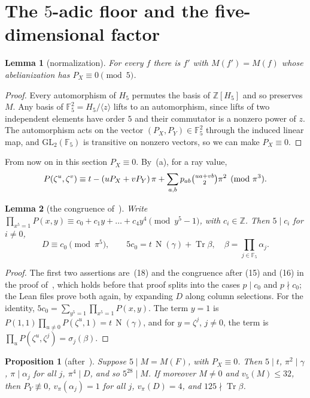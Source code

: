 \documentclass[11pt]{article}
\newtheorem{lemma}{Lemma}
\newtheorem{proposition}{Proposition}
\theoremstyle{definition}
\theoremstyle{remark}
\newcommand{\F}{\mathbb F_5}
\newcommand{\Z}{\mathbb Z}
\newcommand{\Tr}{\operatorname{Tr}}
\newcommand{\N}{\operatorname{N}}
\newcommand{\vp}{v_\pi}
\begin{document}
\section{The \texorpdfstring{$5$}{5}-adic floor and the five-dimensional factor}\label{sec:floor}

\begin{lemma}[normalization]\label{lem:normalize}
For every $f$ there is $f'$ with $M(f')=M(f)$ whose abelianization has
$P_X\equiv0\pmod5$.
\end{lemma}

\begin{proof}
Every automorphism of $H_5$ permutes the basis of $\Z[H_5]$ and so preserves
$M$. Any basis of $\F^2=H_5/\langle z\rangle$ lifts to an automorphism, since
lifts of two independent elements have order $5$ and their commutator is a
nonzero power of $z$. The automorphism acts on the vector $(P_X,P_Y)\in\F^2$ through the induced
linear map, and $\mathrm{GL}_2(\F)$ is transitive on nonzero vectors, so we can
make $P_X\equiv0$.
\end{proof}

\noindent From now on in this section $P_X\equiv0$. By~(a), for a ray value,
\begin{equation}\label{eq:taylor}
P(\zeta^u,\zeta^v)\equiv t-(uP_X+vP_Y)\,\pi+\sum_{a,b}p_{ab}\tbinom{ua+vb}{2}\pi^2\pmod{\pi^3}.
\end{equation}

\begin{lemma}[{the congruence of~\cite{mp}}]\label{lem:c0}
Write $\prod_{x^5=1}P(x,y)\equiv c_0+c_1y+\dots+c_4y^4\pmod{y^5-1}$, with
$c_i\in\Z$. Then $5\mid c_i$ for $i\ne0$,
\[
D\equiv c_0\pmod{\pi^5},\qquad 5c_0=t\,\N(\gamma)+\Tr\beta,\quad
\beta=\prod_{j\in\F}\alpha_j .
\]
\end{lemma}

\begin{proof}
The first two assertions are~(18) and the congruence after (15) and (16) in the
proof of~\cite[Theorem~3.1]{mp}, which holds before that proof splits into the
cases $p\mid c_0$ and $p\nmid c_0$; the Lean files prove both again, by
expanding $D$ along column selections. For the identity,
$5c_0=\sum_{y^5=1}\prod_{x^5=1}P(x,y)$. The term $y=1$ is
$P(1,1)\prod_{u\ne0}P(\zeta^u,1)=t\,\N(\gamma)$, and for $y=\zeta^j$, $j\ne0$,
the term is $\prod_uP(\zeta^u,\zeta^j)=\sigma_j(\beta)$.
\end{proof}

\begin{proposition}[{after~\cite[Theorem~3.4]{mp}}]\label{prop:floor}
Suppose $5\mid M=M(F)$, with $P_X\equiv0$. Then $5\mid t$, $\pi^2\mid\gamma$,
$\pi\mid\alpha_j$ for all $j$, $\pi^4\mid D$, and so $5^{28}\mid M$. If
moreover $M\ne0$ and $v_5(M)\le32$, then $P_Y\not\equiv0$, $\vp(\alpha_j)=1$
for all $j$, $\vp(D)=4$, and $125\nmid\Tr\beta$.
\end{proposition}
\end{document}
